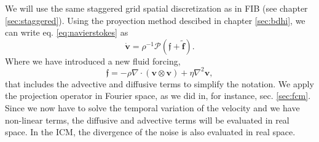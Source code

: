 \documentclass[ twoside,openright,titlepage,numbers=noenddot,%
headinclude,footinclude,cleardoublepage=empty,abstract=on,
BCOR=5mm,paper=a4,fontsize=11pt, dvipsnames
]{scrreprt}
\renewcommand{\vec}[1]{\bm{#1}}
\newcommand{\oper}[1]{\mathcal{#1}}
\newcommand{\fvel}{v}
\begin{document}
We will use the same staggered grid spatial discretization as in \gls{FIB} (see chapter \ref{sec:staggered}).
Using the proyection method descibed in chapter \ref{sec:bdhi}, we can write eq. \eqref{eq:navierstokes} as
\begin{equation}
  \dot{\vec{\fvel}} = \rho^{-1} \oper{P}\left(\vec{\mathfrak{f}} + \tilde{\vec{f}}\right).
\end{equation}
Where we have introduced a new fluid forcing,
\begin{equation}
  \vec{\mathfrak{f}} = -\rho\nabla\cdot (\vec{\fvel}\otimes\vec{\fvel}) + \eta\nabla^2\vec{\fvel},
\end{equation}
that includes the advective and diffusive terms to simplify the notation.
We apply the projection operator in Fourier space, as we did in, for instance, sec. \ref{sec:fcm}. Since we now have to solve the temporal variation of the velocity and we have non-linear terms, the diffusive and advective terms will be evaluated in real space. In the \gls{ICM}, the divergence of the noise is also evaluated in real space.
\end{document}
